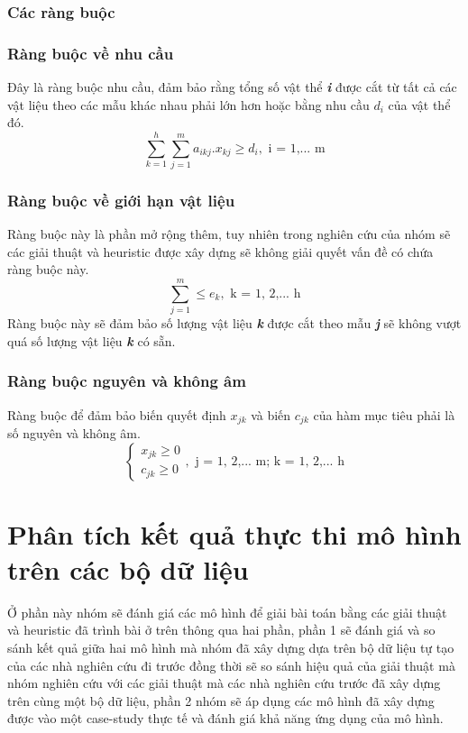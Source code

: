 \documentclass[a4paper]{article}
\begin{document}
\subsubsection{Các ràng buộc}
\subsubsection{Ràng buộc về nhu cầu}
\indent\indent Đây là ràng buộc nhu cầu, đảm bảo rằng tổng số vật thể \textbf{\textit{i}} được cắt từ tất cả các vật liệu theo các mẫu khác nhau phải lớn hơn hoặc bằng nhu cầu \textbf{\textit{$d_{i}$}} của vật thể đó.
\begin{equation}
    \sum_{k = 1}^{h}\sum_{j = 1}^{m} a_{ikj}.x_{kj} \geq d_{i}, \text{ i = 1,... m}
\end{equation}
\subsubsection{Ràng buộc về giới hạn vật liệu}
\indent \indent Ràng buộc này là phần mở rộng thêm, tuy nhiên trong nghiên cứu của nhóm sẽ các giải thuật và heuristic được xây dựng sẽ không giải quyết vấn đề có chứa ràng buộc này.
\begin{equation}
    \sum_{j = 1}^{m} \leq e_{k}, \text{ k = 1, 2,... h}
\end{equation}
\indent Ràng buộc này sẽ đảm bảo số lượng vật liệu \textbf{\textit{k}} được cắt theo mẫu \textbf{\textit{j}} sẽ không vượt quá số lượng vật liệu \textbf{\textit{k}} có sẵn.
\subsubsection{Ràng buộc nguyên và không âm}
\indent\indent Ràng buộc để đảm bảo biến quyết định $x_{jk}$ và biến $c_{jk}$ của hàm mục tiêu phải là số nguyên và không âm. 
\begin{equation}
    \begin{cases}
        x_{jk} \geq 0 \\
        c_{jk} \geq 0  
    \end{cases}
    , \text{ j = 1, 2,... m; k = 1, 2,... h}
\end{equation}



\section{Phân tích kết quả thực thi mô hình trên các bộ dữ liệu}
\indent\indent Ở phần này nhóm sẽ đánh giá các mô hình để giải bài toán bằng các giải thuật và heuristic đã trình bài ở trên thông qua hai phần, phần 1 sẽ đánh giá và so sánh kết quả giữa hai mô hình mà nhóm đã xây dựng dựa trên bộ dữ liệu tự tạo của các nhà nghiên cứu đi trước đồng thời sẽ so sánh hiệu quả của giải thuật mà nhóm nghiên cứu với các giải thuật mà các nhà nghiên cứu trước đã xây dựng trên cùng một bộ dữ liệu, phần 2 nhóm sẽ áp dụng các mô hình đã xây dựng được vào một case-study thực tế và đánh giá khả năng ứng dụng của mô hình.
\end{document}
